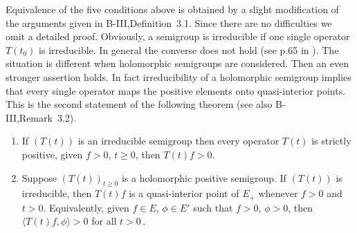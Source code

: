 Equivalence of the five conditions above is obtained by a slight modification of the arguments given in B-III,Definition~3.1.
Since there are no difficulties we omit a detailed proof.
Obviously, a semigroup is irreducible if one single operator $T(t_{0})$ is irreducible.
In general the converse does not hold (see p.65 in \citet{greiner:1982}).
The situation is different when holomorphic semigroups are considered.
Then an even stronger assertion holds. In fact irreducibility of a holomorphic semigroup implies that every single operator maps the positive elements onto quasi-interior points.
This is the second statement of the following theorem (see also B-III,Remark~3.2).
\begin{theorem}\label{thm:c3-3.2}
	\begin{enumerate}[\upshape (i), wide, labelsep=1em, itemsep=1ex]
	\item
 	If $(T(t))$ is an irreducible semigroup then every operator $T(t)$ is strictly positive, \ie 
	given $f > 0$, $t \geq 0$, then $T(t)f > 0$.
	
	\item 
	Suppose $(T(t))_{t\geq 0}$ is a holomorphic positive semigroup.
	If $(T(t))$ is irreducible, then $T(t)f$ is a quasi-interior point of $E_{+}$ whenever $f > 0$ and $t > 0$.
	Equivalently, given $f \in E$, $\phi \in E'$ such that $f > 0$, $\phi > 0$, then $\langle T(t)f,\phi \rangle > 0$ for all $t > 0$\,.
	\end{enumerate}
\end{theorem}
%
%
